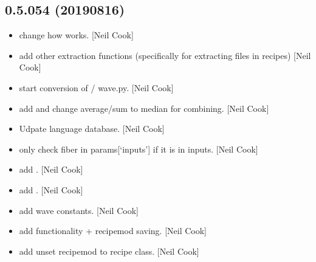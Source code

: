 \documentclass[a4paper,10pt,english]{report}
\begin{document}
\subsection{0.5.054 (2019\sphinxhyphen{}08\sphinxhyphen{}16)}
\label{\detokenize{misc/changelog:id107}}\begin{itemize}
\item {} 
 \sphinxhyphen{} change how  works.
{[}Neil Cook{]}

\item {} 
 \sphinxhyphen{} add other extraction functions
(specifically for extracting files in recipes) {[}Neil Cook{]}

\item {} 
 \sphinxhyphen{} start conversion of  /
wave.py. {[}Neil Cook{]}

\item {} 
 \sphinxhyphen{} add  and change average/sum to median
for combining. {[}Neil Cook{]}

\item {} 
Udpate language database. {[}Neil Cook{]}

\item {} 
 \sphinxhyphen{} only check fiber in params{[}‘inputs’{]} if it is in
inputs. {[}Neil Cook{]}

\item {} 
 \sphinxhyphen{} add . {[}Neil Cook{]}

\item {} 
 \sphinxhyphen{} add . {[}Neil Cook{]}

\item {} 
 \sphinxhyphen{} add wave constants. {[}Neil
Cook{]}

\item {} 
 \sphinxhyphen{} add  functionality + recipemod
saving. {[}Neil Cook{]}

\item {} 
 \sphinxhyphen{} add unset recipemod to recipe class. {[}Neil
Cook{]}


\end{itemize}
\end{document}
